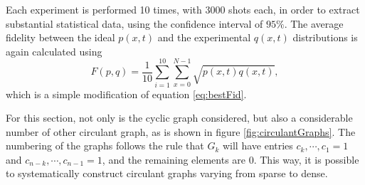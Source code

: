 \documentclass[../../dissertation.tex]{subfiles}
\begin{document}
Each experiment is performed 10 times, with $3000$ shots each, in order to
extract substantial statistical data, using the confidence interval of $95\%$.
The average fidelity between the ideal $p(x,t)$ and the experimental $q(x,t)$
distributions is again calculated using
\begin{equation}
    F(p,q) = \frac{1}{10}\sum_{i = 1}^{10} \sum_{x=0}^{N-1} \sqrt{p(x,t)q(x,t)},
    \label{eq:avgFid}
\end{equation}
which is a simple modification of equation \ref{eq:bestFid}.\par

For this section, not only is the cyclic graph considered, but also a considerable
number of other circulant graph, as is shown in figure
\ref{fig:circulantGraphs}. The numbering of the graphs follows the rule that
$G_k$ will have entries $c_k, \cdots, c_1 = 1$ and $c_{n-k},\cdots,c_{n-1} =
1$, and the remaining elements are $0$. This way, it is possible to
systematically construct circulant graphs varying from sparse to dense.  
\end{document}

